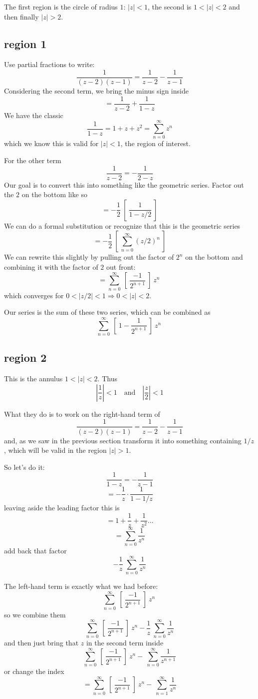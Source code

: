 \documentclass[11pt, oneside]{article}
\begin{document}
The first region is the circle of radius $1$:  $|z| < 1$, the second is $1 < |z| < 2$ and then finally $|z| > 2$.

\subsection*{region 1}
Use partial fractions to write:
\[ \frac{1}{(z-2)(z-1)} = \frac{1}{z-2} - \frac{1}{z-1} \]
Considering the second term, we bring the minus sign inside
\[ = \frac{1}{z-2} + \frac{1}{1-z} \]
We have the classic
\[ \frac{1}{1-z} = 1 + z + z^2 = \sum_{n=0}^{\infty} z^n \]
which we know this is valid for $|z| < 1$, the region of interest.

For the other term
\[ \frac{1}{z - 2} = - \frac{1}{2 - z} \]
Our goal is to convert this into something like the geometric series.  Factor out the $2$ on the bottom like so
\[ = - \frac{1}{2} \ [ \  \frac{1}{1 - z/2} \ ]  \]
We can do a formal substitution or recognize that this is the geometric series 
\[ = - \frac{1}{2} \ [ \   \sum_{n=0}^{\infty} (z/2)^n \ ]  \]
We can rewrite this slightly by pulling out the factor of $2^n$ on the bottom and combining it with the factor of $2$ out front:
\[ = \sum_{n=0}^{\infty} \ [ \ \frac{-1}{2^{n+1}} \ ] \  z^n \  \]
which converges for $0 < |z/2| < 1 \Rightarrow 0 < |z| < 2$.

Our series is the sum of these two series, which can be combined as
\[ \sum_{n=0}^{\infty} \ [ \ 1 - \frac{1}{2^{n+1}} \ ] \  z^n \  \]

\subsection*{region 2}
This is the annulus $1 < |z| < 2$.  Thus
\[ | \frac{1}{z} | < 1 \  \ \ \text{ and } \ \ \  |\frac{z}{2} | < 1 \]

What they do is to work on the right-hand term of
\[ \frac{1}{(z-2)(z-1)} = \frac{1}{z-2} - \frac{1}{z-1} \]
and, as we saw in the previous section transform it into something containing $1/z$, which will be valid in the region $|z| > 1$.

So let's do it:
\[ \frac{1}{1 - z} = - \frac{1}{z - 1}  \]
\[ = - \frac{1}{z} \cdot \frac{1}{1 - 1/z}  \]
leaving aside the leading factor this is
\[ = 1 + \frac{1}{z} + \frac{1}{z^2} \dots \]
\[ = \sum_{n=0}^{\infty} \frac{1}{z^n} \]
add back that factor
\[ -\frac{1}{z} \ \sum_{n=0}^{\infty} \frac{1}{z^n} \]

The left-hand term is exactly what we had before:
\[ \sum_{n=0}^{\infty} \ [ \ \frac{-1}{2^{n+1}} \ ] \  z^n \  \]
so we combine them
\[ \sum_{n=0}^{\infty} \ [ \ \frac{-1}{2^{n+1}} \ ] \  z^n -\frac{1}{z} \ \sum_{n=0}^{\infty} \frac{1}{z^n} \]
and then just bring that $z$ in the second term inside
\[ \sum_{n=0}^{\infty} \ [ \ \frac{-1}{2^{n+1}} \ ] \  z^n - \ \sum_{n=0}^{\infty} \frac{1}{z^{n+1}} \]
or change the index
\[ = \sum_{n=0}^{\infty} \ [ \ \frac{-1}{2^{n+1}} \ ] \  z^n - \ \sum_{n=1}^{\infty} \frac{1}{z^{n}} \]
\end{document}
